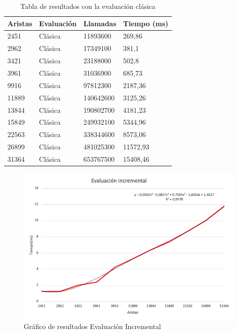 \documentclass[oneside,onecolumn]{article}
\begin{document}
\begin{table}[h]
  \caption{Tabla de resultados con la evaluación clásica}
  \centering
  \begin{tabular}{|l|l|l|l|}
    \hline
    Aristas  & Evaluación & Llamadas  & Tiempo (ms) \\ \hline
    2451 & Clásica    & 11893600  & 269,86      \\ \hline
    2962 & Clásica    & 17349100  & 381,1       \\ \hline
    3421 & Clásica    & 23188000  & 502,8       \\ \hline
    3961 & Clásica    & 31036900  & 685,73      \\ \hline
    9916 & Clásica    & 97812300  & 2187,36     \\ \hline
    11889 & Clásica    & 140642600 & 3125,26     \\ \hline
    13844 & Clásica    & 190802700 & 4181,23     \\ \hline
    15849 & Clásica    & 249932100 & 5344,96     \\ \hline
    22563 & Clásica    & 338344600 & 8573,06     \\ \hline
    26899 & Clásica    & 481025300 & 11572,93    \\ \hline
    31364 & Clásica    & 653767500 & 15408,46    \\ \hline
  \end{tabular}
\end{table}

\newpage

\begin{figure}[h]
  \centering
  \includegraphics[scale=0.52]{graficos/eval_incr.png}
  \caption{Gráfico de resultados Evaluación Incremental}
\end{figure}
\end{document}
